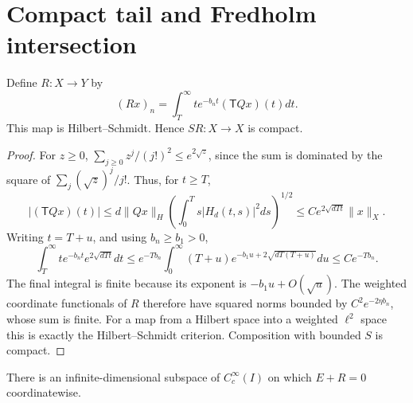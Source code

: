 \section{Compact tail and Fredholm intersection}\label{sec:fredholm}
\begin{lemma}\label{lem:tail}
Define \(R:X\to Y\) by
\begin{equation}\label{eq:R}
(Rx)_n=\int_T^\infty te^{-b_nt}(\mathsf TQx)(t)dt.
\end{equation}
This map is Hilbert--Schmidt. Hence \(SR:X\to X\) is compact.
\end{lemma}
\begin{proof}
For \(z\ge0\), \(\sum_{j\ge0}z^j/(j!)^2\le e^{2\sqrt z}\), since the sum is dominated by the square of \(\sum_j(\sqrt z)^j/j!\). Thus, for \(t\ge T\),
\begin{equation}\label{eq:tailgrowth}
|(\mathsf TQx)(t)|\le d\|Qx\|_H\left(\int_0^T s|H_d(t,s)|^2ds\right)^{1/2}
\le C e^{2\sqrt{dTt}}\|x\|_X.
\end{equation}
Writing \(t=T+u\), and using \(b_n\ge b_1>0\),
\[
\int_T^\infty te^{-b_nt}e^{2\sqrt{dTt}}dt
\le e^{-Tb_n}\int_0^\infty(T+u)e^{-b_1u+2\sqrt{dT(T+u)}}du
\le C e^{-Tb_n}.
\]
The final integral is finite because its exponent is \(-b_1u+O(\sqrt u)\). The weighted coordinate functionals of \(R\) therefore have squared norms bounded by \(C^2e^{-2\eta b_n}\), whose sum is finite. For a map from a Hilbert space into a weighted \(\ell^2\) space this is exactly the Hilbert--Schmidt criterion. Composition with bounded \(S\) is compact.
\end{proof}
\begin{proposition}\label{prop:fredholm}
There is an infinite-dimensional subspace of \(C_c^\infty(I)\) on which \(E+R=0\) coordinatewise.
\end{proposition}
